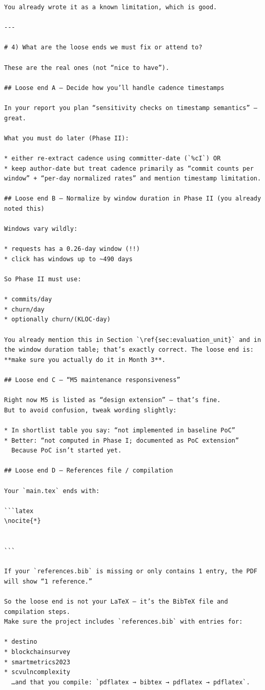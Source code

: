 \documentclass[11pt,a4paper]{article}
\begin{document}
\begin{verbatim}
You already wrote it as a known limitation, which is good.

---

# 4) What are the loose ends we must fix or attend to?

These are the real ones (not “nice to have”).

## Loose end A — Decide how you’ll handle cadence timestamps

In your report you plan “sensitivity checks on timestamp semantics” — great.

What you must do later (Phase II):

* either re-extract cadence using committer-date (`%cI`) OR
* keep author-date but treat cadence primarily as “commit counts per window” + “per-day normalized rates” and mention timestamp limitation.

## Loose end B — Normalize by window duration in Phase II (you already noted this)

Windows vary wildly:

* requests has a 0.26-day window (!!)
* click has windows up to ~490 days

So Phase II must use:

* commits/day
* churn/day
* optionally churn/(KLOC·day)

You already mention this in Section `\ref{sec:evaluation_unit}` and in the window duration table; that’s exactly correct. The loose end is: **make sure you actually do it in Month 3**.

## Loose end C — “M5 maintenance responsiveness”

Right now M5 is listed as “design extension” — that’s fine.
But to avoid confusion, tweak wording slightly:

* In shortlist table you say: “not implemented in baseline PoC”
* Better: “not computed in Phase I; documented as PoC extension”
  Because PoC isn’t started yet.

## Loose end D — References file / compilation

Your `main.tex` ends with:

```latex
\nocite{*}


```

If your `references.bib` is missing or only contains 1 entry, the PDF will show “1 reference.”

So the loose end is not your LaTeX — it’s the BibTeX file and compilation steps.
Make sure the project includes `references.bib` with entries for:

* destino
* blockchainsurvey
* smartmetrics2023
* scvulncomplexity
  …and that you compile: `pdflatex → bibtex → pdflatex → pdflatex`.


\end{verbatim}
\end{document}
